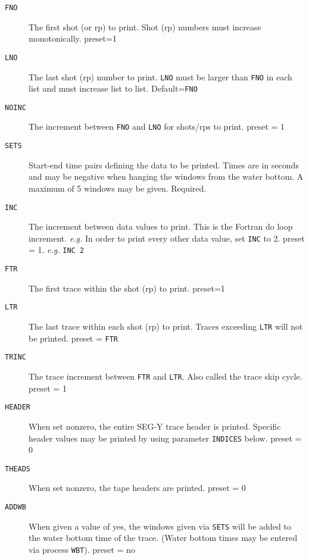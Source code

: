 \begin{description}
\item[\texttt{FNO}] The first \gls{shot} (or \gls{rp}) to print.  Shot (\gls{rp}) numbers must
         increase monotonically.
         \Gls{preset}=1

\item[\texttt{LNO}] The last \gls{shot} (\gls{rp}) number to print.  \texttt{LNO} must be larger than
         \texttt{FNO} in each list and must increase list to list.
         Default=\texttt{FNO}

\item[\texttt{NOINC}] The increment between \texttt{FNO} and \texttt{LNO} for \glspl{shot}/\glspl{rp} to print.
         \Gls{preset} = 1

\item[\texttt{SETS}] Start-end time pairs defining the data to be printed.  Times
         are in seconds and may be negative when hanging the windows
         from the water bottom.  A maximum of 5 windows may be given.
         Required.

\item[\texttt{INC}] The increment between data values to print.  This is the
         Fortran do loop increment.  \textit{e.g.}  In order to print every other
         data value, set \texttt{INC} to 2.
         \Gls{preset} = 1.  \textit{e.g.} \texttt{INC 2}

\item[\texttt{FTR}] The first trace within the \gls{shot} (\gls{rp}) to print.
         \Gls{preset}=1

\item[\texttt{LTR}] The last trace within each \gls{shot} (\gls{rp}) to print.  Traces
         exceeding \texttt{LTR} will not be printed.
         \Gls{preset} = \texttt{FTR}

\item[\texttt{TRINC}] The trace increment between \texttt{FTR} and \texttt{LTR}. Also called the trace skip cycle.  \Gls{preset} = 1

\item[\texttt{HEADER}] When set nonzero, the entire SEG-Y trace header is printed.
         Specific header values may be printed by using parameter
         \texttt{INDICES} below.
         \Gls{preset} = 0

\item[\texttt{THEADS}] When set nonzero, the tape headers are printed.
         \Gls{preset} = 0

\item[\texttt{ADDWB}] When given a value of yes, the windows given via \texttt{SETS} will be
         added to the water bottom time of the trace.  (Water bottom
         times may be entered via process \texttt{WBT}).
         \Gls{preset} = no


\end{description}

